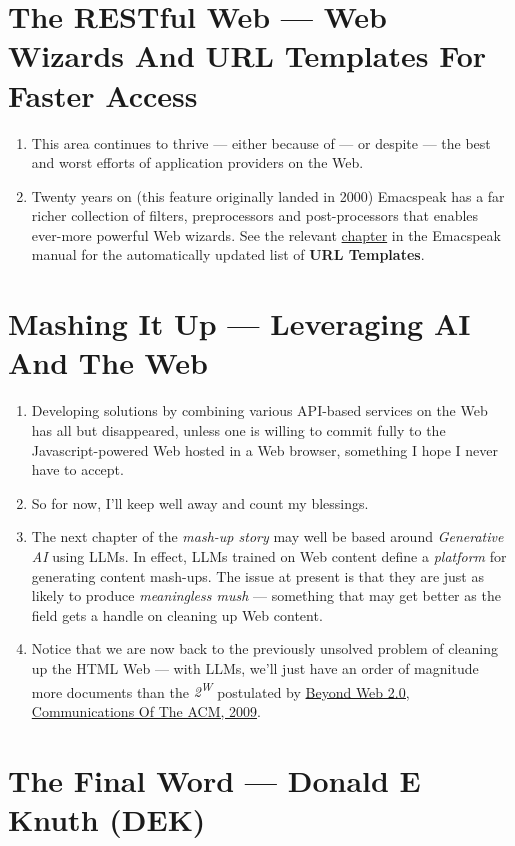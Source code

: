 \documentclass[11pt]{article}
\begin{document}
\section{The RESTful Web —  Web Wizards And URL Templates For Faster Access}
\label{sec:orga509428}

\begin{enumerate}
\item This area continues to thrive --- either because of --- or
despite --- the best and worst efforts of application providers on the
Web.
\item Twenty years on (this feature originally landed in 2000)
Emacspeak has a far richer collection of filters, preprocessors
and post-processors
 that enables ever-more powerful Web
wizards. See the relevant \href{https://tvraman.github.io/emacspeak/manual/URL-Templates.html}{chapter} in the Emacspeak manual for the
automatically updated list of \textbf{URL Templates}.
\end{enumerate}
\section{Mashing It Up —  Leveraging  AI And The Web}
\label{sec:org14db90b}

\begin{enumerate}
\item Developing solutions by combining various API-based services on
the Web has all but disappeared, unless one is willing to commit
fully to the Javascript-powered Web hosted in a Web browser,
something I hope I never have to accept.
\item So for now, I'll keep
well away and count my blessings.
\item The next chapter of the \emph{mash-up story} may well be based around
 \emph{Generative AI} using LLMs. In effect, LLMs trained on   Web content 
define a \emph{platform} for generating content mash-ups.  The issue
at present is that they are just as  likely  to produce
\emph{meaningless mush} ---
something that may  get better as the field gets a
handle on cleaning up  Web content.
\item Notice that we are now back to the previously unsolved problem
of cleaning up the  HTML Web --- with LLMs, we'll just
have an order of magnitude more documents than the \emph{2\textsuperscript{W}} postulated
 by  \href{https://research.google/blog/beyond-web-20/?hl=in\&m=1}{Beyond Web 2.0, Communications
Of The ACM, 2009}.
\end{enumerate}
\section{The Final Word --- Donald E Knuth (DEK)}
\label{sec:orgf9eb95f}
\end{document}
